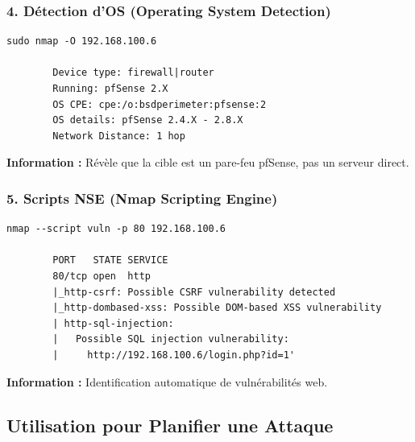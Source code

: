 \documentclass[12pt,a4paper,openany]{report}
\begin{document}
	\subsubsection{4. Détection d'OS (Operating System Detection)}
	\begin{lstlisting}[caption=OS fingerprinting]
		sudo nmap -O 192.168.100.6
		
		Device type: firewall|router
		Running: pfSense 2.X
		OS CPE: cpe:/o:bsdperimeter:pfsense:2
		OS details: pfSense 2.4.X - 2.8.X
		Network Distance: 1 hop
	\end{lstlisting}
	\textbf{Information :} Révèle que la cible est un pare-feu pfSense, pas un serveur direct.
	
	\subsubsection{5. Scripts NSE (Nmap Scripting Engine)}
	\begin{lstlisting}[caption=Scripts de vulnérabilités]
		nmap --script vuln -p 80 192.168.100.6
		
		PORT   STATE SERVICE
		80/tcp open  http
		|_http-csrf: Possible CSRF vulnerability detected
		|_http-dombased-xss: Possible DOM-based XSS vulnerability
		| http-sql-injection:
		|   Possible SQL injection vulnerability:
		|     http://192.168.100.6/login.php?id=1'
	\end{lstlisting}
	\textbf{Information :} Identification automatique de vulnérabilités web.
	
	\subsection{Utilisation pour Planifier une Attaque}
	
\end{document}
